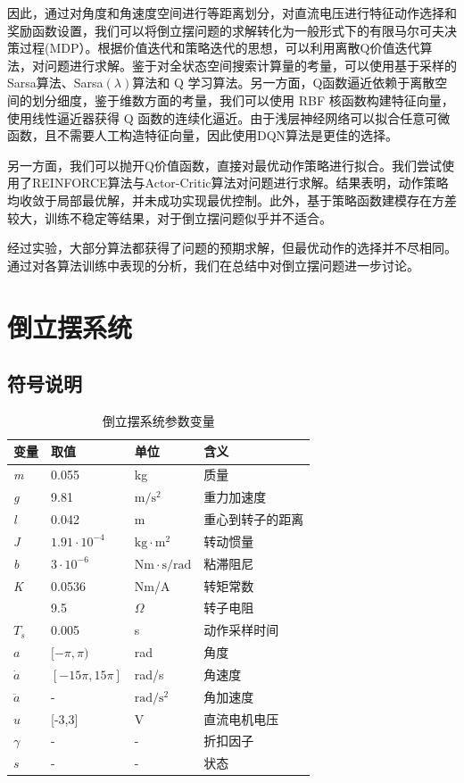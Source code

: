 \documentclass[conference,10pt]{IEEEtran}
\begin{document}
因此，通过对角度和角速度空间进行等距离划分，对直流电压进行特征动作选择和奖励函数设置，我们可以将倒立摆问题的求解转化为一般形式下的有限马尔可夫决策过程(MDP）。根据价值迭代和策略迭代的思想，可以利用离散Q价值迭代算法，对问题进行求解。鉴于对全状态空间搜索计算量的考量，可以使用基于采样的 Sarsa算法、Sarsa$(\lambda)$算法和 Q 学习算法。另一方面，Q函数逼近依赖于离散空间的划分细度，鉴于维数方面的考量，我们可以使用 RBF 核函数构建特征向量，使用线性逼近器获得 Q 函数的连续化逼近。由于浅层神经网络可以拟合任意可微函数，且不需要人工构造特征向量，因此使用DQN算法是更佳的选择。

另一方面，我们可以抛开Q价值函数，直接对最优动作策略进行拟合。我们尝试使用了REINFORCE算法与Actor-Critic算法对问题进行求解。结果表明，动作策略均收敛于局部最优解，并未成功实现最优控制。此外，基于策略函数建模存在方差较大，训练不稳定等结果，对于倒立摆问题似乎并不适合。

经过实验，大部分算法都获得了问题的预期求解，但最优动作的选择并不尽相同。通过对各算法训练中表现的分析，我们在总结中对倒立摆问题进一步讨论。
\section{倒立摆系统}
\subsection{符号说明}
\begin{table}[H]
	\centering
	\caption{倒立摆系统参数变量}
	\label{tb1}
	\begin{tabular}{llll}
		\hline
		变量&取值  &单位  &含义   \\ \hline
		\textit{m}& 0.055 & kg & 质量 \\ 
		\textit{g} & 9.81 & $\mathrm{m}/\mathrm{s}^2$ & 重力加速度  \\ 
		\textit{l} & 0.042 & m & 重心到转子的距离 \\ 
		\textit{J}&$1.91\cdot10^{-4}$  & $\mathrm{kg}\cdot\mathrm{m}^2$ &转动惯量  \\ 
		\textit{b}&$3\cdot10^{-6}$  &$\mathrm{Nm\cdot s/rad}$  & 粘滞阻尼 \\ 
		\textit{K}& 0.0536 & Nm/A & 转矩常数 \\
		\text{R}& 9.5 & $\Omega$ &转子电阻  \\
		$T_s$&0.005&s&动作采样时间\\
		$a$ & $[-\pi,\pi)$ &  rad & 角度  \\
		$\dot{a}$& $[-15\pi, 15\pi]$ & rad/s & 角速度  \\
		$\ddot{a}$& - & $\mathrm{rad/s^2}$ &   角加速度\\ 
		$u$&[-3,3]&V&直流电机电压\\
		$\gamma$&-&-&折扣因子\\
		$s$&-&-&状态\\ \hline
	\end{tabular}
\end{table}
\end{document}
